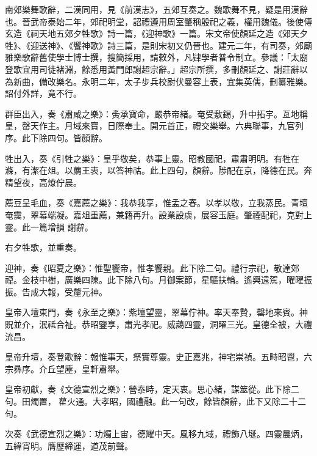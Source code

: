 
\begin{pinyinscope}

 南郊樂舞歌辭，二漢同用，見《前漢志》，五郊互奏之。魏歌舞不見，疑是用漢辭也。晉武帝泰始二年，郊祀明堂，詔禮遵用周室肇稱殷祀之義，權用魏儀。後使傅玄造《祠天地五郊夕牲歌》詩一篇，《迎神歌》一篇。宋文帝使顏延之造《郊天夕牲》、《迎送神》、《饗神歌》詩三篇，是則宋初又仍晉也。建元二年，有司奏，郊廟雅樂歌辭舊使學士博士撰，搜簡採用，請敕外，凡肄學者普令制立。參議：「太廟登歌宜用司徒褚淵，餘悉用黃門郎謝超宗辭。」超宗所撰，多刪顏延之、謝莊辭以為新曲，備改樂名。永明二年，太子步兵校尉伏曼容上表，宜集英儒，刪纂雅樂。詔付外詳，竟不行。



 群臣出入，奏《肅咸之樂》：夤承寶命，嚴恭帝緒。奄受敷錫，升中拓宇。亙地稱皇，罄天作主。月域來寶，日際奉土。開元首正，禮交樂舉。六典聯事，九官列序。此下除四句。皆顏辭。



 牲出入，奏《引牲之樂》：皇乎敬矣，恭事上靈。昭教國祀，肅肅明明。有牲在滌，有潔在俎。以薦王衷，以答神祜。此上四句，顏辭。陟配在京，降德在民。奔精望夜，高燎佇晨。



 薦豆呈毛血，奏《嘉薦之樂》：我恭我享，惟孟之春。以孝以敬，立我蒸民。青壇奄靄，翠幕端凝。嘉俎重薦，兼籍再升。設業設虡，展容玉庭。肇禋配祀，克對上靈。此一篇增損
 謝辭。



 右夕牲歌，並重奏。



 迎神，奏《昭夏之樂》：惟聖饗帝，惟孝饗親。此下除二句。禮行宗祀，敬達郊禋。金枝中樹，廣樂四陳。此下除八句。月御案節，星驅扶輪。遙興遠駕，曜曜振振。告成大報，受釐元神。



 皇帝入壇東門，奏《永至之樂》：紫壇望靈，翠幕佇神。率天奉贄，罄地來賓。神貺並介，泯祗合祉。恭昭鑒享，肅光孝祀。威藹四靈，洞曜三光。皇德全被，大禮流昌。



 皇帝升壇，奏登歌辭：報惟事天，祭實尊靈。史正嘉兆，神宅崇禎。五畤昭鬯，六宗彞序。介丘望塵，皇軒肅舉。



 皇帝初獻，奏《文德宣烈之樂》：營泰畤，定天衷。思心緒，謀筮從。此下除二句。田燭置，雚火通。大孝昭，國禮融。此一句改，餘皆顏辭，此下又除二十二句。



 次奏《武德宣烈之樂》：功燭上宙，德耀中天。風移九域，禮飾八埏。四靈晨炳，五緯宵明。膺歷締運，道茂前聲。




\end{pinyinscope}
